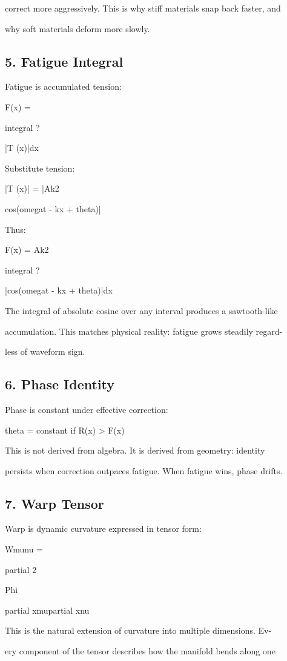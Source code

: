 \documentclass[10pt]{article}
\begin{document}
correct more aggressively. This is why stiff materials snap back faster, and

why soft materials deform more slowly.

\subsection*{5. Fatigue Integral}
Fatigue is accumulated tension:

F(x) =

integral ?

|T (x)|dx

Substitute tension:

|T (x)| = |Ak2

cos(omegat - kx + theta)|

Thus:

F(x) = Ak2

integral ?

|cos(omegat - kx + theta)|dx

The integral of absolute cosine over any interval produces a sawtooth-like

accumulation. This matches physical reality: fatigue grows steadily regard-

less of waveform sign.

\subsection*{6. Phase Identity}
Phase is constant under effective correction:

theta = constant if R(x) > F(x)

This is not derived from algebra. It is derived from geometry: identity

persists when correction outpaces fatigue. When fatigue wins, phase drifts.

\subsection*{7. Warp Tensor}
Warp is dynamic curvature expressed in tensor form:

Wmunu =

partial 2

Phi

partial xmupartial xnu


This is the natural extension of curvature into multiple dimensions. Ev-

ery component of the tensor describes how the manifold bends along one
\end{document}
